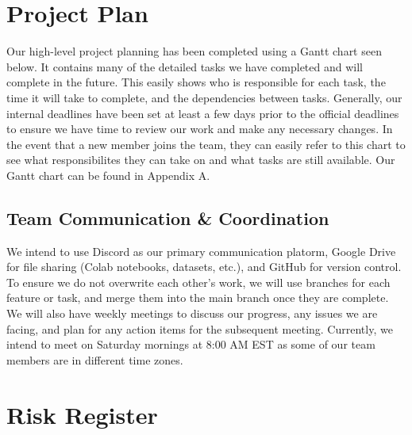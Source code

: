 \documentclass{article} %
\begin{document}
\section{Project Plan}
\label{project_plan}

Our high-level project planning has been completed using a Gantt chart seen below. It contains many of the detailed tasks we have completed and will complete in the future. This
easily shows who is responsible for each task, the time it will take to complete, and the dependencies between tasks. Generally, our internal deadlines have been set at least a 
few days prior to the official deadlines to ensure we have time to review our work and make any necessary changes. In the event that a new member joins the team, they can easily
refer to this chart to see what responsibilites they can take on and what tasks are still available. Our Gantt chart can be found in Appendix A.

\subsection{Team Communication \& Coordination}

We intend to use Discord as our primary communication platorm, Google Drive for file sharing (Colab notebooks, datasets, etc.), and GitHub for version control. To ensure we do 
not overwrite each other's work, we will use branches for each feature or task, and merge them into the main branch once they are complete. We will also have weekly meetings to
discuss our progress, any issues we are facing, and plan for any action items for the subsequent meeting. Currently, we intend to meet on Saturday mornings at 8:00 AM EST as some
of our team members are in different time zones.

\section{Risk Register}
\label{risk_register}

\label{last_page}



\end{document}
